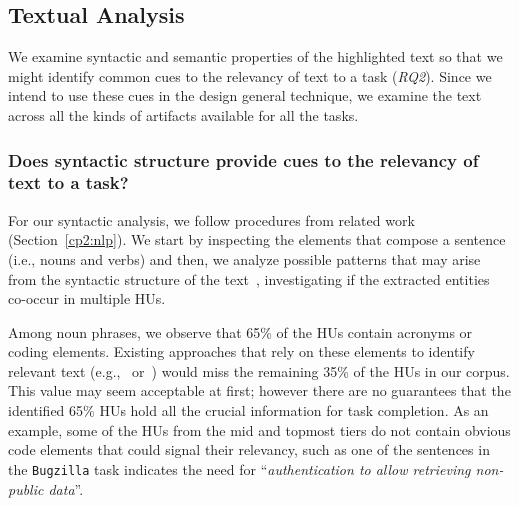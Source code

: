 
\subsection{Textual Analysis}


We examine syntactic and semantic properties 
of the highlighted text so that 
we might identify
common cues to the relevancy of text to a task (\textit{RQ2}).
Since we intend to use these cues 
in the design general technique, 
we examine the text across 
all the kinds of artifacts 
available for all the tasks. 




 





\subsubsection{Does syntactic structure provide cues to the relevancy of text to a task?}
\label{cp3:syntactic-analysis}


For our syntactic analysis, we follow procedures from related work (Section~\ref{cp2:nlp}).
We start by inspecting the elements that compose a sentence (i.e., nouns and verbs)
and then, we analyze possible patterns that may arise from the syntactic structure of the text~\cite{Robillard2015},
investigating if the extracted entities co-occur in multiple HUs.






Among noun phrases, we observe that 65\% of the HUs contain acronyms or coding elements.
Existing approaches that rely on these elements to identify relevant text (e.g.,~\cite{Robillard2015} or~\cite{Jiang2016b}) would miss the remaining 35\% of the HUs in our corpus.
This value may seem acceptable at first; however there are no guarantees that
the identified 65\% HUs hold all the crucial information for task completion.
As an example, some of the HUs from the mid and topmost tiers 
do not contain obvious code elements that could signal their relevancy,
such as one of the sentences in the \texttt{Bugzilla} task indicates the need for ``\textit{authentication to allow retrieving non-public data}''.





